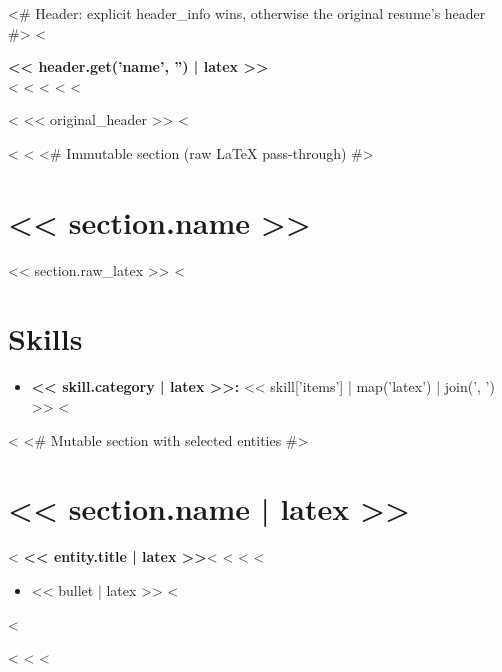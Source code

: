\documentclass[letterpaper,11pt]{article}
\begin{document}
<# Header: explicit header_info wins, otherwise the original resume's header #>
<%
\begin{center}
  {\LARGE \textbf{<< header.get('name', '') | latex >>}} \\[4pt]
  <%
  <%
  <%
  <%
  <%
\end{center}
<%
<< original_header >>
<%

<%
<%
<# Immutable section (raw LaTeX pass-through) #>
\section{<< section.name >>}
<< section.raw_latex >>
<%
\section{Skills}
\begin{itemize}[leftmargin=*, nosep]
<%
  \item \textbf{<< skill.category | latex >>:} << skill['items'] | map('latex') | join(', ') >>
<%
\end{itemize}
<%
<# Mutable section with selected entities #>
\section{<< section.name | latex >>}
<%
\textbf{<< entity.title | latex >>}<%
<%
<%
<%
\begin{itemize}[leftmargin=*, nosep]
<%
  \item << bullet | latex >>
<%
\end{itemize}
<%

<%
<%
<%
\end{document}
